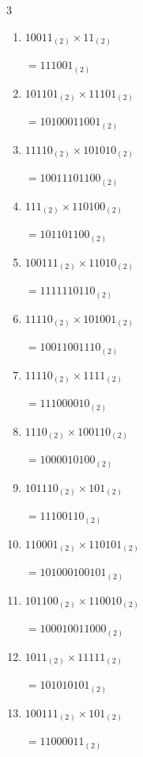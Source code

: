 \begin{multicols}{3}
\begin{enumerate}
        $=10001100_{(2)}$

  \item $10011_{(2)} \times 11_{(2)}$

        $=111001_{(2)}$

  \item $101101_{(2)} \times 11101_{(2)}$

        $=10100011001_{(2)}$

  \item $11110_{(2)} \times 101010_{(2)}$

        $=10011101100_{(2)}$

\columnbreak %

  \item $111_{(2)} \times 110100_{(2)}$

        $=101101100_{(2)}$

  \item $100111_{(2)} \times 11010_{(2)}$

        $=1111110110_{(2)}$

  \item $11110_{(2)} \times 101001_{(2)}$

        $=10011001110_{(2)}$

  \item $11110_{(2)} \times 1111_{(2)}$

        $=111000010_{(2)}$

  \item $1110_{(2)} \times 100110_{(2)}$

        $=1000010100_{(2)}$

\columnbreak %

  \item $101110_{(2)} \times 101_{(2)}$

        $=11100110_{(2)}$

  \item $110001_{(2)} \times 110101_{(2)}$

        $=101000100101_{(2)}$

  \item $101100_{(2)} \times 110010_{(2)}$

        $=100010011000_{(2)}$

  \item $1011_{(2)} \times 11111_{(2)}$

        $=101010101_{(2)}$

  \item $100111_{(2)} \times 101_{(2)}$

        $=11000011_{(2)}$


\end{enumerate}
\end{multicols}
